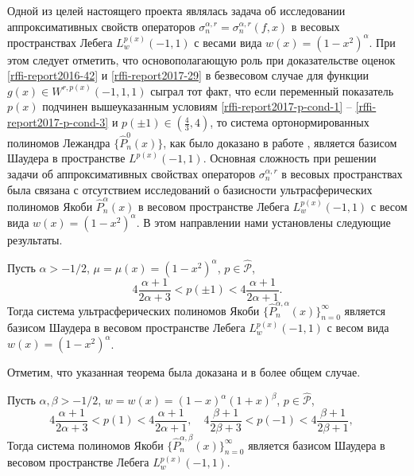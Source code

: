 Одной из целей настоящего проекта являлась задача об исследовании аппроксимативных свойств операторов
$\sigma_{n}^{\alpha,r}=\sigma_{n}^{\alpha,r}(f,x)$ в весовых пространствах Лебега $L^{p(x)}_w(-1,1)$ с весами вида $w(x)=(1-x^2)^\alpha$.  При этом следует отметить, что основополагающую роль при доказательстве оценок \eqref{rffi-report2016-42} и \eqref{rffi-report2017-29} в безвесовом случае для функции $g(x)\in W^{r,p(x)}(-1,1,1)$ сыграл тот факт, что если переменный показатель $p(x)$ подчинен вышеуказанным условиям \ref{rffi-report2017-p-cond-1} -- \ref{rffi-report2017-p-cond-3} и $p(\pm1)\in (\frac43,4)$, то система ортонормированных полиномов Лежандра $\{\hat{P}_n^{0}(x)\}$, как было доказано в работе \cite{rffi-report2016-shar31},  является базисом Шаудера в пространстве $L^{p(x)}(-1,1)$. Основная сложность при решении задачи об аппроксимативных свойствах операторов $\sigma_{n}^{\alpha,r}$ в весовых пространствах была связана с отсутствием исследований о базисности ультрасферических полиномов Якоби $\hat{P}^{\alpha}_n(x)$ в весовом пространстве Лебега $L^{p(x)}_w(-1,1)$ с весом вида $w(x)=(1-x^2)^\alpha$.
В этом направлении нами установлены следующие результаты.

\begin{theorem}\label{rffi-report2017-jacobi-weighted-basis}
Пусть $\alpha>-1/2$, $\mu=\mu(x)=(1-x^2)^\alpha$, $p\in\mathcal{ \hat P}$,
$$4\frac{\alpha+1}{2\alpha+3}<p(\pm1)<4\frac{\alpha+1}{2\alpha+1}.$$
Тогда система ультрасферических полиномов Якоби $\{\hat{P}^{\alpha,\alpha}_n(x)\}_{n=0}^\infty$ является базисом Шаудера в весовом пространстве Лебега $L^{p(x)}_w(-1,1)$ с весом вида $w(x)=(1-x^2)^\alpha$.
\end{theorem}

Отметим, что указанная теорема была доказана и в более общем случае.
\begin{theorem}
	Пусть $\alpha,\beta>-1/2$, $w=w(x)=(1-x)^\alpha(1+x)^\beta$, $p\in\mathcal{\hat P}$,
	$$
	4\frac{\alpha+1}{2\alpha+3}<p(1)<4\frac{\alpha+1}{2\alpha+1},\quad
	4\frac{\beta+1}{2\beta+3}<p(-1)<4\frac{\beta+1}{2\beta+1},\quad
	$$
	Тогда система полиномов Якоби $\{\hat{P}^{\alpha,\beta}_n(x)\}_{n=0}^\infty$ является базисом Шаудера в весовом пространстве Лебега $L^{p(x)}_w(-1,1)$.
\end{theorem}

